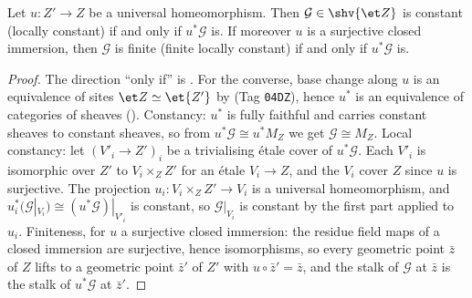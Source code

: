 \begin{lemma}
\label{lemma:constructible-universal-homeomorphism-invariance}
\leanok
Let $u\colon Z'\to Z$ be a universal homeomorphism.  Then
$\mathcal G\in\shv{\et Z}$ is constant (locally constant) if and only if
$u^*\mathcal G$ is.  If moreover $u$ is a surjective closed immersion, then
$\mathcal G$ is finite (finite locally constant) if and only if
$u^*\mathcal G$ is.
\end{lemma}
\begin{proof}
\leanok
The direction ``only if'' is
.
For the converse, base change along $u$ is an equivalence of sites
$\et Z\simeq\et{Z'}$ by
(Tag \texttt{04DZ}), hence $u^*$ is an equivalence of categories of sheaves
().  Constancy: $u^*$ is
fully faithful and carries constant sheaves to constant sheaves, so from
$u^*\mathcal G\cong u^*M_{Z}$ we get $\mathcal G\cong M_Z$.  Local
constancy: let $(V'_i\to Z')_i$ be a trivialising \'etale cover of
$u^*\mathcal G$.  Each $V'_i$ is isomorphic over $Z'$ to $V_i\times_ZZ'$
for an \'etale $V_i\to Z$, and the $V_i$ cover $Z$ since $u$ is
surjective.  The projection $u_i\colon V_i\times_ZZ'\to V_i$ is a
universal homeomorphism, and $u_i^*(\mathcal G|_{V_i})\cong
(u^*\mathcal G)|_{V'_i}$ is constant, so $\mathcal G|_{V_i}$ is constant
by the first part applied to $u_i$.  Finiteness, for $u$ a surjective closed
immersion: the residue field maps of a closed immersion are surjective,
hence isomorphisms, so every geometric point $\bar z$ of $Z$ lifts to a
geometric point $\bar z'$ of $Z'$ with $u\circ\bar z'=\bar z$, and the
stalk of $\mathcal G$ at $\bar z$ is the stalk of $u^*\mathcal G$ at
$\bar z'$.
\end{proof}

